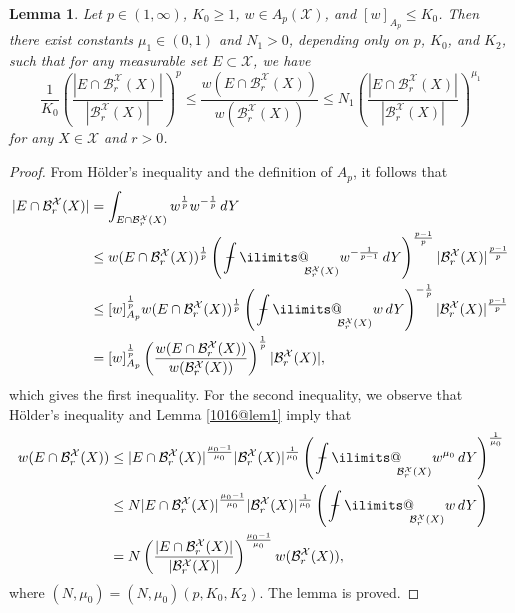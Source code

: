 \documentclass[reqno]{amsart}
\numberwithin{equation}{section}
\theoremstyle{plain}
\newtheorem{lemma}[theorem]{Lemma}
\theoremstyle{definition}
\theoremstyle{remark}
\begin{document}
\begin{lemma}		\label{1015@lem3}
Let $p\in (1,\infty)$, $K_0 \ge 1$, $w\in A_p({\mathcal{X}})$, and  $[w]_{A_p}\le K_0$. 
Then there exist  constants $\mu_1\in (0,1)$ and  $N_1>0$, depending only on $p$, $K_0$, and $K_2$, such that for any measurable set $E\subset {\mathcal{X}}$, we have 
\[
\frac{1}{K_0}\left(\frac{|E\cap {\mathcal{B}}_r^{\mathcal{X}}(X)|}{|{\mathcal{B}}_r^{\mathcal{X}}(X)|}\right)^p\le \frac{w(E\cap {\mathcal{B}}_r^{\mathcal{X}}(X))}{w({\mathcal{B}}_r^{\mathcal{X}}(X))}\le N_1\left(\frac{|E\cap {\mathcal{B}}_r^{\mathcal{X}}(X)|}{|{\mathcal{B}}_r^{\mathcal{X}}(X)|}\right)^{\mu_1}
\]
for any $X\in {\mathcal{X}}$ and $r>0$.
\end{lemma}

\begin{proof}
From H\"older's inequality and the definition of $A_p$, it follows that 
\begin{align*}
|E\cap {\mathcal{B}}_r^{\mathcal{X}}(X)|&=\int_{E\cap {\mathcal{B}}_r^{\mathcal{X}}(X)}w^{\frac{1}{p}}w^{-\frac{1}{p}}\,dY\\
&\le w(E\cap {\mathcal{B}}_r^{\mathcal{X}}(X))^{\frac{1}{p}}\left({\operatorname{\,\,\text{\bf--}\kern-.98em\DOTSI\intop\ilimits@\!\!}}_{{\mathcal{B}}_r^{\mathcal{X}}(X)}w^{-\frac{1}{p-1}}\,dY\right)^{\frac{p-1}{p}}|{\mathcal{B}}_r^{\mathcal{X}}(X)|^{\frac{p-1}{p}}\\
& \le [w]_{A_p}^{\frac{1}{p}} w(E\cap {\mathcal{B}}_r^{\mathcal{X}}(X))^{\frac{1}{p}}\left({\operatorname{\,\,\text{\bf--}\kern-.98em\DOTSI\intop\ilimits@\!\!}}_{{\mathcal{B}}_r^{\mathcal{X}}(X)}w\,dY\right)^{-\frac{1}{p}}|{\mathcal{B}}_r^{\mathcal{X}}(X)|^{\frac{p-1}{p}}\\
&=[w]_{A_p}^{\frac{1}{p}}\left(\frac{w(E\cap {\mathcal{B}}_r^{\mathcal{X}}(X))}{w({\mathcal{B}}_r^{\mathcal{X}}(X))}\right)^{\frac{1}{p}}|{\mathcal{B}}_r^{\mathcal{X}}(X)|,
\end{align*}
which gives  the first inequality.
For the second inequality, we observe that H\"older's inequality and Lemma \ref{1016@lem1} imply that
\begin{align*}
w(E\cap {\mathcal{B}}_r^{\mathcal{X}}(X))&\le |E\cap {\mathcal{B}}_r^{\mathcal{X}}(X)|^{\frac{\mu_0-1}{\mu_0}}|{\mathcal{B}}_r^{\mathcal{X}}(X)|^{\frac{1}{\mu_0}}\left({\operatorname{\,\,\text{\bf--}\kern-.98em\DOTSI\intop\ilimits@\!\!}}_{{\mathcal{B}}_r^{\mathcal{X}}(X)} w^{\mu_0}\, dY\right)^{\frac{1}{\mu_0}}\\
&\le N|E\cap {\mathcal{B}}_r^{\mathcal{X}}(X)|^{\frac{\mu_0-1}{\mu_0}}|{\mathcal{B}}_r^{\mathcal{X}}(X)|^{\frac{1}{\mu_0}}\left({\operatorname{\,\,\text{\bf--}\kern-.98em\DOTSI\intop\ilimits@\!\!}}_{{\mathcal{B}}_r^{\mathcal{X}}(X)} w\, dY\right)\\
&=N\left(\frac{|E\cap {\mathcal{B}}_r^{\mathcal{X}}(X)|}{|{\mathcal{B}}_r^{\mathcal{X}}(X)|}\right)^{\frac{\mu_0-1}{\mu_0}}w({\mathcal{B}}_r^{\mathcal{X}}(X)),
\end{align*}
where $(N,\mu_0)=(N,\mu_0)(p,K_0,K_2)$.
The lemma is proved.
\end{proof}
\end{document}

